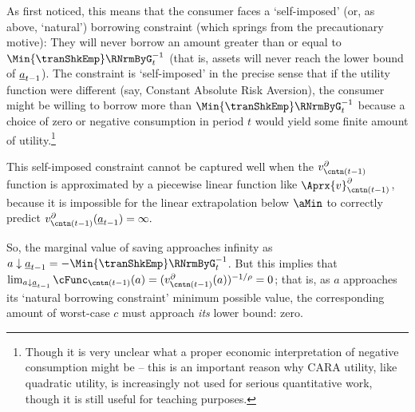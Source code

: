 \documentclass[titlepage, headings=optiontotocandhead]{econark}
\begin{document}
{As \cite{zeldesStochastic} first noticed, this means that the consumer faces a `self-imposed' (or, as above, `natural') borrowing constraint (which springs from the precautionary motive): They will never borrow an amount greater than or equal to $\Min{\tranShkEmp}\RNrmByG_{t}^{-1}$ (that is, assets will never reach the lower bound of $\underline{a}_{t-1}$).  The constraint is `self-imposed' in the precise sense that if the utility function were different (say, Constant Absolute Risk Aversion), the consumer might be willing to borrow more than $\Min{\tranShkEmp}\RNrmByG_{t}^{-1}$ because a choice of zero or negative consumption in period $t$ would yield some finite amount of utility.\footnote{Though it is very unclear what a proper economic interpretation of negative consumption might be -- this is an important reason why CARA utility, like quadratic utility, is increasingly not used for serious quantitative work, though it is still useful for teaching purposes.}

This self-imposed constraint cannot be captured well when the $v^{\partial}_{{\cntn}(t-1)}$ function is approximated by a piecewise linear function like $\Aprx{v}^{\partial}_{{\cntn}(t-1)}$, because it is impossible for the linear extrapolation below $\aMin$ to correctly predict $v^{\partial}_{{\cntn}(t-1)}(\NatBoroCnstra_{t-1})=\infty.$ %


So, the marginal value of saving approaches infinity as $a \downarrow \NatBoroCnstra_{t-1}=-\Min{\tranShkEmp}\RNrmByG_{t}^{-1}$.  But this implies that $\lim_{a \downarrow \NatBoroCnstra_{t-1}} \cFunc_{{\cntn}(t-1)}(a) = (v^{\partial}_{{\cntn}(t-1)}(a))^{-1/\rho} = 0$; that is, as $a$ approaches its `natural borrowing constraint' minimum possible value, the corresponding amount of worst-case $c$ must approach \textit{its} lower bound: zero.

}
\end{document}
